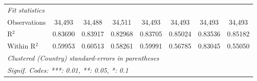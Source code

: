 \begin{tabular}{lccccccc}
   \midrule
   \emph{Fit statistics}\\
   Observations                  & 34,493          & 34,488          & 34,511         & 34,493          & 34,493        & 34,493          & 34,493\\  
   R$^2$                         & 0.83690         & 0.83917         & 0.82968        & 0.83705         & 0.85024       & 0.83536         & 0.85182\\  
   Within R$^2$                  & 0.59953         & 0.60513         & 0.58261        & 0.59991         & 0.56785       & 0.83045         & 0.55050\\  
   \midrule \midrule
   \multicolumn{8}{l}{\emph{Clustered (Country) standard-errors in parentheses}}\\
   \multicolumn{8}{l}{\emph{Signif. Codes: ***: 0.01, **: 0.05, *: 0.1}}\\
\end{tabular}
\par\endgroup


